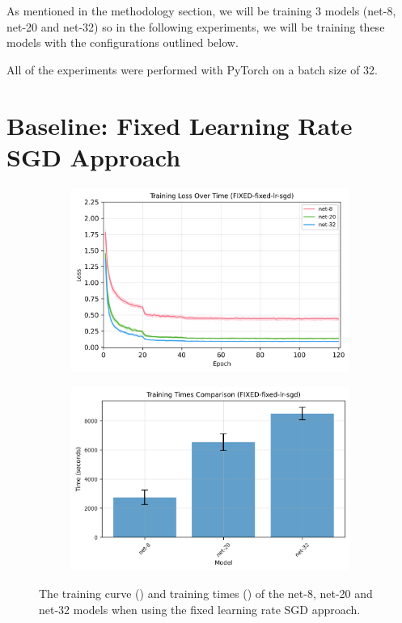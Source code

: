 \documentclass[logo,bsc,singlespacing,parskip,online]{infthesis}
\begin{document}
As mentioned in the methodology section, we will be training 3 models 
(net-8, net-20 and net-32) so in the following experiments, we will 
be training these models with the configurations outlined below.

All of the experiments were performed with PyTorch on a batch size of 32.

\section{Baseline: Fixed Learning Rate SGD Approach}
\begin{figure}[h]
   \centering
   \begin{subfigure}[b]{0.45\textwidth}
      \centering
      \includegraphics[width=\textwidth]{FIXED-fixed-lr-sgd_training_losses.png}  
      \caption{}
      \label{fig:fixed-lr-sgd-losses}
   \end{subfigure}
   \begin{subfigure}[b]{0.45\textwidth}
      \centering
      \includegraphics[width=\textwidth]{FIXED-fixed-lr-sgd_training_times.png}
      \caption{}
      \label{fig:fixed-lr-sgd-times}
   \end{subfigure}
   \caption{The training curve () and training times () of the net-8, net-20 and net-32 models when using the fixed learning rate SGD approach.}
   \label{fig:training-curves}
\end{figure}
\end{document}
